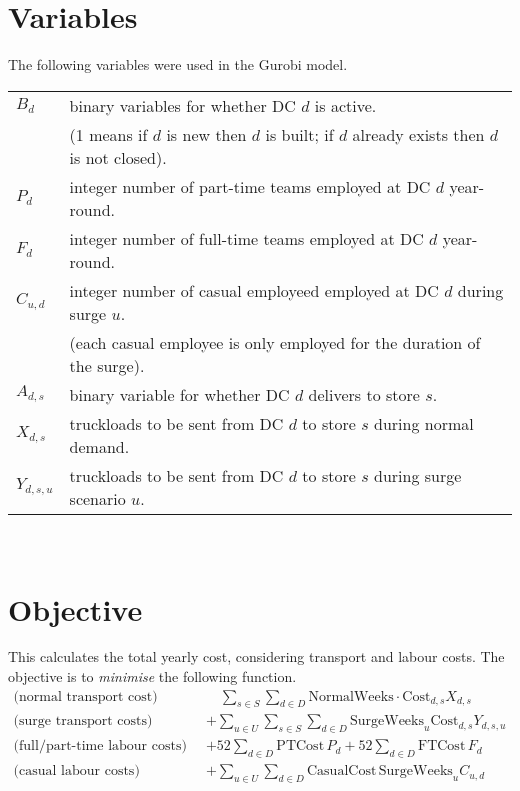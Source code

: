 \documentclass[11pt,a4paper]{article}
\begin{document}
\section{Variables}
The following variables were used in the Gurobi model.\\[0.8em]
\begin{tabular}{l l}
    $B_{d}$ & binary variables for whether DC $d$ is active. \\ 
    & (1 means if $d$ is new then $d$ is built; if $d$ 
    already exists then $d$ is not closed). \\
    $P_d$ & integer number of part-time teams employed at DC $d$ year-round. \\ 
    $F_d$ & integer number of full-time teams employed at DC $d$ year-round. \\ 
    $C_{u,d}$ & integer number of casual employeed employed at DC $d$  during surge $u$. \\
    & (each casual employee is only employed for the duration of the surge). \\ 
    $A_{d,s}$ & binary variable for whether DC $d$ delivers to store $s$. \\  
    $X_{d,s}$ & truckloads to be sent from DC $d$ to store $s$ during normal demand. \\
    $Y_{d,s,u}$ & truckloads to be sent from DC $d$ to store $s$ during 
    surge scenario $u$. 
\end{tabular}
\\[0.8em]

\section{Objective}
This calculates the total yearly cost, considering transport and labour costs.
The objective is to \textit{minimise} the following function.
\begin{align*}
    \text{(normal transport cost)} \qquad&\quad \sum_{s \in S} \sum_{d \in D} \mathrm{NormalWeeks} \cdot \mathrm{Cost}_{d, s}  X_{d,s} \\ 
    \text{(surge transport costs)} \qquad &+ \sum_{u \in U} \sum_{s \in S} \sum_{d \in D} \mathrm{SurgeWeeks}_u \mathrm{Cost}_{d, s} Y_{d,s,u} \\ 
    \text{(full/part-time labour costs)} \qquad &+ 52 \sum_{d \in D} \mathrm{PTCost}\, P_d + 52 \sum_{d \in D}\mathrm{FTCost} \,F_d \\
    \text{(casual labour costs)} \qquad &+\sum_{u \in U} \sum_{d \in D} \mathrm{CasualCost}\,\mathrm{SurgeWeeks}_u C_{u,d}
\end{align*}
\end{document}
